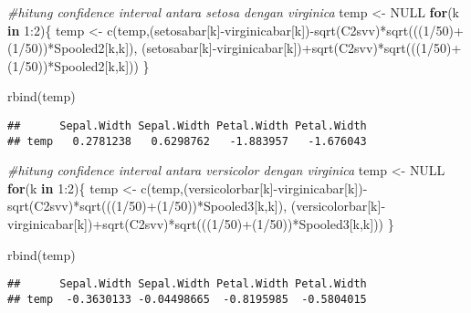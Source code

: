 \documentclass[
]{article}
\newenvironment{Shaded}{\begin{snugshade}}{\end{snugshade}}
\newcommand{\CommentTok}[1]{\textcolor[rgb]{0.56,0.35,0.01}{\textit{#1}}}
\newcommand{\ConstantTok}[1]{\textcolor[rgb]{0.00,0.00,0.00}{#1}}
\newcommand{\ControlFlowTok}[1]{\textcolor[rgb]{0.13,0.29,0.53}{\textbf{#1}}}
\newcommand{\DecValTok}[1]{\textcolor[rgb]{0.00,0.00,0.81}{#1}}
\newcommand{\FunctionTok}[1]{\textcolor[rgb]{0.00,0.00,0.00}{#1}}
\newcommand{\NormalTok}[1]{#1}
\newcommand{\OtherTok}[1]{\textcolor[rgb]{0.56,0.35,0.01}{#1}}
\newcommand{\SpecialCharTok}[1]{\textcolor[rgb]{0.00,0.00,0.00}{#1}}
\begin{document}
\begin{Shaded}
\begin{Highlighting}[]
\CommentTok{\#hitung confidence interval antara setosa dengan virginica}
\NormalTok{temp }\OtherTok{\textless{}{-}} \ConstantTok{NULL}
\ControlFlowTok{for}\NormalTok{(k }\ControlFlowTok{in} \DecValTok{1}\SpecialCharTok{:}\DecValTok{2}\NormalTok{)\{}
\NormalTok{    temp }\OtherTok{\textless{}{-}} \FunctionTok{c}\NormalTok{(temp,(setosabar[k]}\SpecialCharTok{{-}}\NormalTok{virginicabar[k])}\SpecialCharTok{{-}}\FunctionTok{sqrt}\NormalTok{(C2svv)}\SpecialCharTok{*}\FunctionTok{sqrt}\NormalTok{(((}\DecValTok{1}\SpecialCharTok{/}\DecValTok{50}\NormalTok{)}\SpecialCharTok{+}\NormalTok{(}\DecValTok{1}\SpecialCharTok{/}\DecValTok{50}\NormalTok{))}\SpecialCharTok{*}\NormalTok{Spooled2[k,k]),}
\NormalTok{          (setosabar[k]}\SpecialCharTok{{-}}\NormalTok{virginicabar[k])}\SpecialCharTok{+}\FunctionTok{sqrt}\NormalTok{(C2svv)}\SpecialCharTok{*}\FunctionTok{sqrt}\NormalTok{(((}\DecValTok{1}\SpecialCharTok{/}\DecValTok{50}\NormalTok{)}\SpecialCharTok{+}\NormalTok{(}\DecValTok{1}\SpecialCharTok{/}\DecValTok{50}\NormalTok{))}\SpecialCharTok{*}\NormalTok{Spooled2[k,k]))}
\NormalTok{\}}

\FunctionTok{rbind}\NormalTok{(temp)}
\end{Highlighting}
\end{Shaded}

\begin{verbatim}
##      Sepal.Width Sepal.Width Petal.Width Petal.Width
## temp   0.2781238   0.6298762   -1.883957   -1.676043
\end{verbatim}

\begin{Shaded}
\begin{Highlighting}[]
\CommentTok{\#hitung confidence interval antara versicolor dengan virginica}
\NormalTok{temp }\OtherTok{\textless{}{-}} \ConstantTok{NULL}
\ControlFlowTok{for}\NormalTok{(k }\ControlFlowTok{in} \DecValTok{1}\SpecialCharTok{:}\DecValTok{2}\NormalTok{)\{}
\NormalTok{    temp }\OtherTok{\textless{}{-}} \FunctionTok{c}\NormalTok{(temp,(versicolorbar[k]}\SpecialCharTok{{-}}\NormalTok{virginicabar[k])}\SpecialCharTok{{-}}\FunctionTok{sqrt}\NormalTok{(C2svv)}\SpecialCharTok{*}\FunctionTok{sqrt}\NormalTok{(((}\DecValTok{1}\SpecialCharTok{/}\DecValTok{50}\NormalTok{)}\SpecialCharTok{+}\NormalTok{(}\DecValTok{1}\SpecialCharTok{/}\DecValTok{50}\NormalTok{))}\SpecialCharTok{*}\NormalTok{Spooled3[k,k]),}
\NormalTok{          (versicolorbar[k]}\SpecialCharTok{{-}}\NormalTok{virginicabar[k])}\SpecialCharTok{+}\FunctionTok{sqrt}\NormalTok{(C2svv)}\SpecialCharTok{*}\FunctionTok{sqrt}\NormalTok{(((}\DecValTok{1}\SpecialCharTok{/}\DecValTok{50}\NormalTok{)}\SpecialCharTok{+}\NormalTok{(}\DecValTok{1}\SpecialCharTok{/}\DecValTok{50}\NormalTok{))}\SpecialCharTok{*}\NormalTok{Spooled3[k,k]))}
\NormalTok{\}}

\FunctionTok{rbind}\NormalTok{(temp)}
\end{Highlighting}
\end{Shaded}

\begin{verbatim}
##      Sepal.Width Sepal.Width Petal.Width Petal.Width
## temp  -0.3630133 -0.04498665  -0.8195985  -0.5804015
\end{verbatim}
\end{document}
